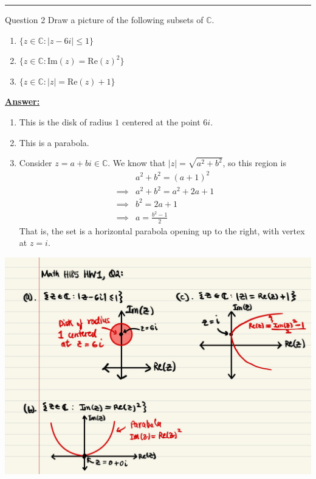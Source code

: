\documentclass{article}
\newcommand{\C}{\mathbb{C}}
\begin{document}
\vskip 0.5cm
\hrule 
\vskip 0.5cm


\begin{mathdefinitionbox}{Question 2}
\vskip 0.5cm
  Draw a picture of the following subsets of $\C$.
  \begin{enumerate}[label=(\alph*)]
    \item $\{ z \in \C : |z - 6i| \leq 1 \}$
    \item $\{ z \in \C : \text{Im}(z) = \text{Re}(z)^2 \}$
    \item $\{ z \in \C : |z| = \text{Re}(z) + 1 \}$
  \end{enumerate}
\end{mathdefinitionbox}

\vskip 0.5cm
\underline{\textbf{Answer:}} 

\begin{enumerate}[label=(\alph*)]
  \item This is the disk of radius $1$ centered at the point $6i$.

  \vskip 0.5cm
  \item This is a parabola.
  
  \vskip 0.5cm
  \item Consider $z = a + bi \in \C$. We know that $|z| = \sqrt{a^2 + b^2}$, so this region is 
  \begin{align*}
    &a^2 + b^2 = (a + 1)^2\\
    \implies &a^2 + b^2 = a^2 + 2a + 1 \\
    \implies &b^2 = 2a + 1 \\
    \implies &a = \frac{b^2 - 1}{2}
  \end{align*}
  That is, the set is a horizontal parabola opening up to the right, with vertex at $z = i$.

\end{enumerate}

\includegraphics[scale=0.30]{Q2.jpg}
\end{document}
